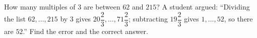 How many multiples of $3$ are between $62$ and $215$? A student argued: ``Dividing the list $62,\dots,215$ by $3$ gives $20\dfrac{2}{3},\dots,71\dfrac{2}{3}$; subtracting $19\dfrac{2}{3}$ gives $1,\dots,52$, so there are $52$.'' Find the error and the correct answer.
